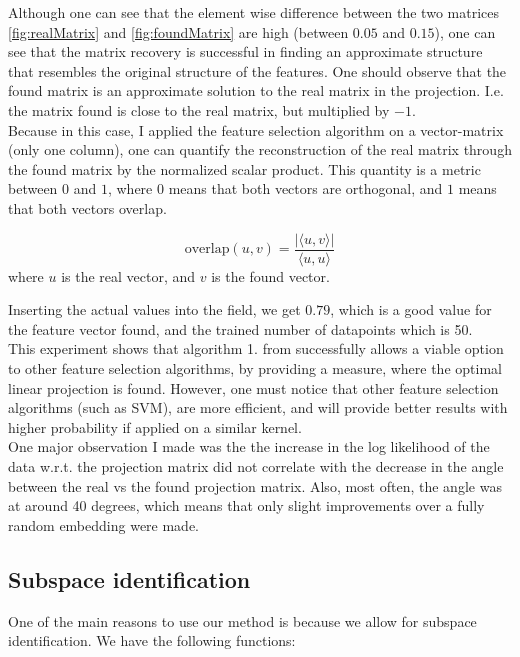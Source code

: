 Although one can see that the element wise difference between the two matrices \ref{fig:realMatrix} and \ref{fig:foundMatrix} are high (between $0.05$ and $0.15$), one can see that the matrix recovery is successful in finding an approximate structure that resembles the original structure of the features.
One should observe that the found matrix is an approximate solution to the real matrix in the projection. I.e. the matrix found is close to the real matrix, but multiplied by $-1$. \\

Because in this case, I applied the feature selection algorithm on a vector-matrix (only one column), one can quantify the reconstruction of the real matrix through the found matrix by the normalized scalar product.
This quantity is a metric between $0$ and $1$, where $0$ means that both vectors are orthogonal, and $1$ means that both vectors overlap.

\begin{equation}
\text{overlap}(u, v) = \frac{| \langle u, v \rangle |}{\langle u, u \rangle}
\end{equation}
where $u$ is the real vector, and $v$ is the found vector.

Inserting the actual values into the field, we get $0.79$, which is a good value for the feature vector found, and the trained number of datapoints which is 50. \\
 
 This experiment shows that algorithm 1. from \citep{Tripathy} successfully allows a viable option to other feature selection algorithms, by providing a measure, where the optimal linear projection is found. 
 However, one must notice that other feature selection algorithms (such as SVM), are more efficient, and will provide better results with higher probability if applied on a similar kernel. \\
 
 One major observation I made was the the increase in the log likelihood of the data w.r.t. the projection matrix did not correlate with the decrease in the angle between the real vs the found projection matrix.
 Also, most often, the angle was at around 40 degrees, which means that only slight improvements over a fully random embedding were made.


\subsection{Subspace identification}
One of the main reasons to use our method is because we allow for subspace identification.
We have the following functions:

